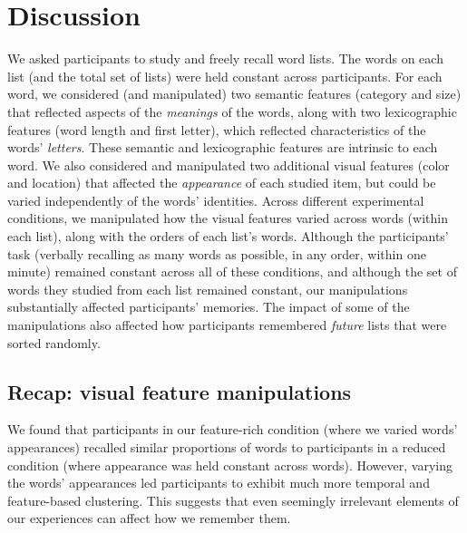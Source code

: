 \documentclass[11pt]{article}
\begin{document}
\section*{Discussion}


We asked participants to study and freely recall word lists. The words on each
list (and the total set of lists) were held constant across participants. For
each word, we considered (and manipulated) two semantic features (category and
size) that reflected aspects of the \textit{meanings} of the words, along with
two lexicographic features (word length and first letter), which reflected
characteristics of the words' \textit{letters}. These semantic and
lexicographic features are intrinsic to each word. We also considered and
manipulated two additional visual features (color and location) that affected
the \textit{appearance} of each studied item, but could be varied independently
of the words' identities. Across different experimental conditions, we
manipulated how the visual features varied across words (within each list),
along with the orders of each list's words. Although the participants' task
(verbally recalling as many words as possible, in any order, within one minute)
remained constant across all of these conditions, and although the set of words
they studied from each list remained constant, our manipulations substantially
affected participants' memories. The impact of some of the manipulations also
affected how participants remembered \textit{future} lists that were sorted
randomly.


\subsection*{Recap: visual feature manipulations}

We found that participants in our feature-rich condition (where we varied
words' appearances) recalled similar proportions of words to participants in a
reduced condition (where appearance was held constant across words). However,
varying the words' appearances led participants to exhibit much more temporal
and feature-based clustering. This suggests that even seemingly irrelevant
elements of our experiences can affect how we remember them.
\end{document}
